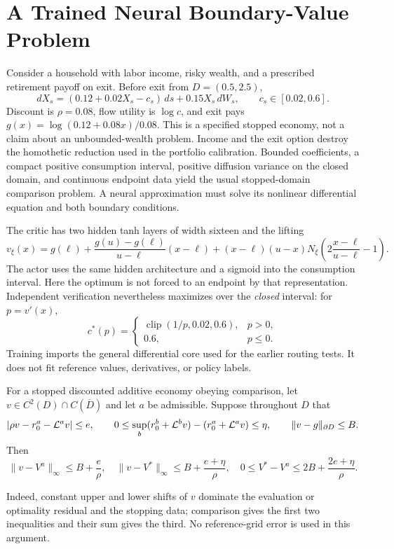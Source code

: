 \section{A Trained Neural Boundary-Value Problem}\label{sec:nonquadratic}
Consider a household with labor income, risky wealth, and a prescribed retirement payoff on exit. Before exit from $D=(0.5,2.5)$,
\begin{equation}\label{eq:stopped-consumption-r6}
 dX_s=(0.12+0.02X_s-c_s)\,ds+0.15X_s\,dW_s,
 \qquad c_s\in[0.02,0.6].
\end{equation}
Discount is $\rho=0.08$, flow utility is $\log c$, and exit pays $g(x)=\log(0.12+0.08x)/0.08$. This is a specified stopped economy, not a claim about an unbounded-wealth problem. Income and the exit option destroy the homothetic reduction used in the portfolio calibration. Bounded coefficients, a compact positive consumption interval, positive diffusion variance on the closed domain, and continuous endpoint data yield the usual stopped-domain comparison problem. A neural approximation must solve its nonlinear differential equation and both boundary conditions.

The critic has two hidden tanh layers of width sixteen and the lifting
\[
 v_\xi(x)=g(\ell)+\frac{g(u)-g(\ell)}{u-\ell}(x-\ell)
 +(x-\ell)(u-x)N_\xi\!\left(2\frac{x-\ell}{u-\ell}-1\right).
\]
The actor uses the same hidden architecture and a sigmoid into the consumption interval. Here the optimum is not forced to an endpoint by that representation. Independent verification nevertheless maximizes over the \emph{closed} interval: for $p=v'(x)$,
\begin{equation}\label{eq:exact-action-r6}
 c^*(p)=\begin{cases}\operatorname{clip}(1/p,0.02,0.6),&p>0,\\0.6,&p\leq0.\end{cases}
\end{equation}
Training imports the general differential core used for the earlier routing tests. It does not fit reference values, derivatives, or policy labels.

\begin{proposition}\label{prop:stopped-r6}
For a stopped discounted additive economy obeying comparison, let $v\in C^2(D)\cap C(\overline D)$ and let $a$ be admissible. Suppose throughout $D$ that
\[
 |\rho v-r_0^a-\mathcal L^av|\leq e,\qquad
 0\leq\sup_b(r_0^b+\mathcal L^bv)-(r_0^a+\mathcal L^av)\leq\eta,
 \qquad\|v-g\|_{\partial D}\leq B.
\]
Then
\begin{equation}\label{eq:stopped-bounds-r6}
 \|v-V^a\|_\infty\leq B+\frac e\rho,\quad
 \|v-V^*\|_\infty\leq B+\frac{e+\eta}\rho,\quad
 0\leq V^*-V^a\leq2B+\frac{2e+\eta}\rho.
\end{equation}
\end{proposition}
Indeed, constant upper and lower shifts of $v$ dominate the evaluation or optimality residual and the stopping data; comparison gives the first two inequalities and their sum gives the third. No reference-grid error is used in this argument.

